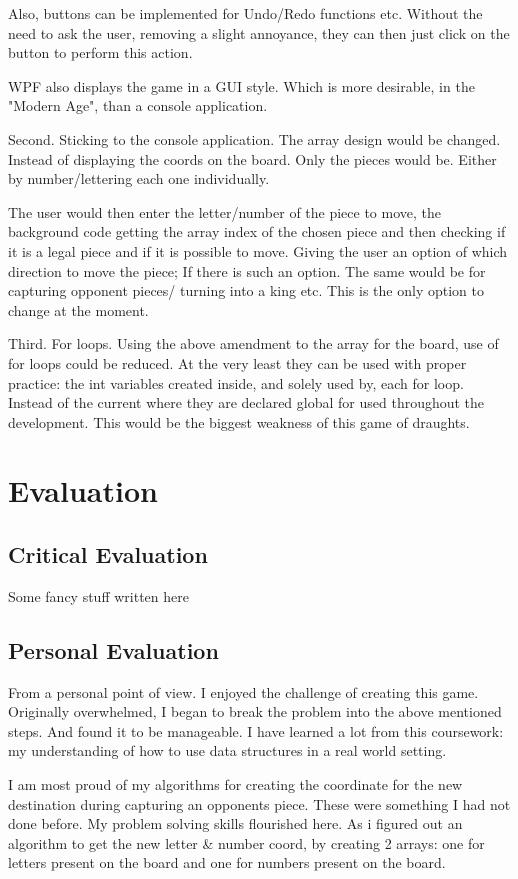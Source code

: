 \documentclass[10pt, a4paper]{article}
\begin{document}
    Also, buttons can be implemented for Undo/Redo functions etc. Without the need to ask the user, removing a slight annoyance, they can then just click on the button to perform this action.
    
    WPF also displays the game in a GUI style. Which is more desirable, in the "Modern Age", than a console application.
    
    Second. Sticking to the console application. The array design would be changed. Instead of displaying the coords on the board. Only the pieces would be. Either by number/lettering each one individually. 
    
    The user would then enter the letter/number of the piece to move, the background code getting the array index of the chosen piece and then checking if it is a legal piece and if it is possible to move. Giving the user an option of which direction to move the piece; If there is such an option. The same would be for capturing opponent pieces/ turning into a king etc. This is the only option to change at the moment.
    
    Third. For loops. Using the above amendment to the array for the board, use of for loops could be reduced. At the very least they can be used with proper practice: the int variables created inside, and solely used by, each for loop. Instead of the current where they are declared global for used throughout the development. This would be the biggest weakness of this game of draughts.
\section{Evaluation}
	\subsection{Critical Evaluation}
	Some fancy stuff written here
	\subsection{Personal Evaluation}
	From a personal point of view. I enjoyed the challenge of creating this game. Originally overwhelmed, I began to break the problem into the above mentioned steps. And found it to be manageable. I have learned a lot from this coursework: my understanding of how to use data structures in a real world setting. 
	
	I am most proud of my algorithms for creating the coordinate for the new destination during capturing an opponents piece. These were something I had not done before. My problem solving skills flourished here. As i figured out an algorithm to get the new letter \& number coord, by creating 2 arrays: one for letters present on the board and one for numbers present on the board.
	
\end{document}
